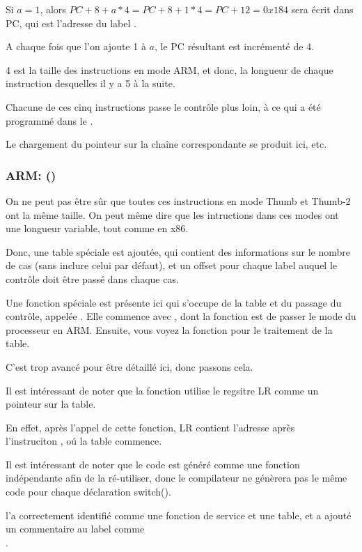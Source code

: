 Si $a=1$, alors $PC+8+a*4 = PC+8+1*4 = PC+12 = 0x184$ sera écrit dans \ac{PC}, qui
est l'adresse du label .

A chaque fois que l'on ajoute 1 à $a$, le \ac{PC} résultant est incrémenté de
4.

4 est la taille des instructions en mode ARM, et donc, la longueur de chaque instruction
 desquelles il y a 5 à la suite.

Chacune de ces cinq instructions  passe le contrôle plus loin, à ce qui a
été programmé dans le .

Le chargement du pointeur sur la chaîne correspondante se produit ici, etc.

\subsubsection{ARM: \OptimizingKeilVI (\ThumbMode)}




On ne peut pas être sûr que toutes ces instructions en mode Thumb et Thumb-2 ont
la même taille. On peut même dire que les intructions dans ces modes ont une longueur
variable, tout comme en x86.


Donc, une table spéciale est ajoutée, qui contient des informations sur le nombre
de cas (sans inclure celui par défaut), et un offset pour chaque label auquel le
contrôle doit être passé dans chaque cas.


Une fonction spéciale est présente ici qui s'occupe de la table et du passage du
contrôle, appelée .
Elle commence avec , dont la fonction est de passer le mode du processeur
en ARM.
Ensuite, vous voyez la fonction pour le traitement de la table.

C'est trop avancé pour être détaillé ici, donc passons cela.


Il est intéressant de noter que la fonction utilise le regsitre \ac{LR} comme un
pointeur sur la table.

En effet, après l'appel de cette fonction, \ac{LR} contient l'adresse après\\
l'instruciton , oú la table commence.

Il est intéressant de noter que le code est généré comme une fonction indépendante
afin de la ré-utiliser, donc le compilateur ne génèrera pas le même code pour chaque
déclaration switch().

\IDA l'a correctement identifié comme une fonction de service et une table, et a
ajouté un commentaire au label comme\\
.

